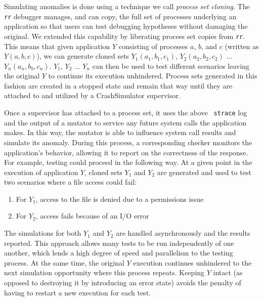 
Simulating anomalies
is done using
a technique
we call {\it process set cloning}.
The {\tt rr} debugger manages,
and can copy,
the full set of processes underlying an application
so that users can test debugging
hypotheses without damaging the original.
We extended this capability
by liberating process set copies from {\tt rr}.
This means that given application $Y$
consisting of processes $a$, $b$, and $c$
(written as $Y(a, b, c)$),
we can generate cloned sets $Y_1(a_1, b_1, c_1)$,
$Y_2(a_2, b_2, c_2)$ ... $Y_n(a_n, b_b, c_n)$.
$Y_1$, $Y_2$ ... $Y_n$ can then be used to test different scenarios leaving
the original $Y$ to continue its execution unhindered.
Process sets generated in this fashion are created in a stopped state and
remain that way until they are attached to and utilized by a CrashSimulator
supervisor.

Once a supervisor has attached to a process set, it uses the above {\tt
strace} log and the output of a mutator to service any future
system calls the application makes.  In this way, the mutator is able to
influence system call results and simulate its anomaly.
During this process,
a corresponding checker
monitors the application's behavior,
allowing it to report on the correctness of the response.
For example, testing could proceed in the following way.
At a given point in the execution of application $Y$,
cloned sets $Y_1$ and $Y_2$ are generated and
used to test two scenarios where a file access could fail:
\begin{enumerate}
    \item{For $Y_1$, access to the file is denied due to a permissions issue}
    \item{For $Y_2$, access fails because of an I/O error}
\end{enumerate}
The simulations for both $Y_1$ and $Y_2$ are handled asynchronously and
the results reported.
This approach allows many tests to be run independently of one another,
which lends a
high degree of speed and
parallelism to the testing process.
At the same time, the original $Y$ execution continues unhindered to the
next simulation opportunity where this process repeats.
Keeping $Y$ intact
(as opposed to destroying it by introducing an error state)
avoids the penalty
of having to restart a new execution for each test.

